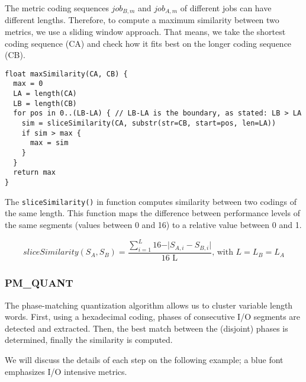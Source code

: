 \documentclass{jhps}
\begin{document}
The metric coding sequences $job_{B,m}$ and $job_{A,m}$ of different jobs can have different lengths.
Therefore, to compute a maximum similarity between two metrics, we use a sliding window approach.
That means, we take the shortest coding sequence (CA) and check how it fits best on the longer coding sequence (CB).


\begin{lstlisting}[caption={Pseudo code of the maxSimilarity() function}]
float maxSimilarity(CA, CB) {
  max = 0
  LA = length(CA)
  LB = length(CB)
  for pos in 0..(LB-LA) { // LB-LA is the boundary, as stated: LB > LA
    sim = sliceSimilarity(CA, substr(str=CB, start=pos, len=LA))
    if sim > max {
      max = sim
    }
  }
  return max
}
\end{lstlisting}

The \texttt{sliceSimilarity()} in  function computes similarity between two codings of the same length.
This function maps the difference between performance levels of the same segments (values between 0 and 16) to a relative value between 0 and 1.

\begin{equation}
sliceSimilarity \left( S_{A},S_{B} \right) =\frac{ \sum _{i=1}^{L_{}}16 - \vert S_{A,i}-S_{B,i} \vert }{\text{16 L}_{}}\text{, with }L=L_{B}=L_{A} \label{eq:slicesim}
\end{equation}

\subsubsection{PM\_QUANT}
The phase-matching quantization algorithm allows us to cluster variable length words.
First, using a hexadecimal coding, phases of consecutive I/O segments are detected and extracted.
Then, the best match between the (disjoint) phases is determined, finally the similarity is computed.

We will discuss the details of each step on the following example; a blue font emphasizes I/O intensive  metrics.

\end{document}
